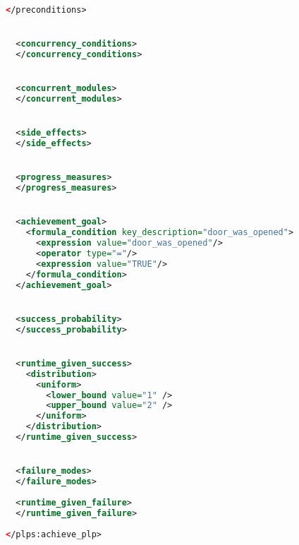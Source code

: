\begin{lstlisting}[style=stylexml,language=XML]
  </preconditions>


  <concurrency_conditions>
  </concurrency_conditions>


  <concurrent_modules>
  </concurrent_modules>


  <side_effects>
  </side_effects>


  <progress_measures>
  </progress_measures>


  <achievement_goal>
    <formula_condition key_description="door_was_opened">
      <expression value="door_was_opened"/>
      <operator type="="/>
      <expression value="TRUE"/>
    </formula_condition>
  </achievement_goal>


  <success_probability>
  </success_probability>


  <runtime_given_success>
    <distribution>
      <uniform>
        <lower_bound value="1" />
        <upper_bound value="2" />
      </uniform>
    </distribution>
  </runtime_given_success>


  <failure_modes>
  </failure_modes>
  
  <runtime_given_failure>
  </runtime_given_failure>
  
</plps:achieve_plp>
	\end{lstlisting}
